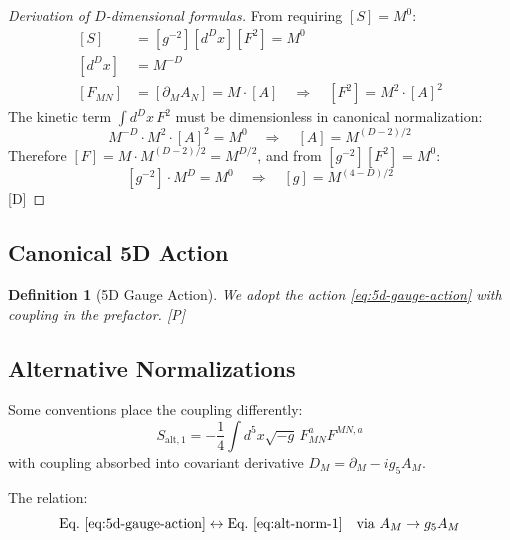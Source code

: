 \documentclass[11pt,a4paper]{article}
\newtheorem{definition}[theorem]{Definition}
\newcommand{\tagD}{\textcolor{blue!70!black}{[D]}}
\newcommand{\tagP}{\textcolor{green!50!black}{[P]}}
\begin{document}
\begin{proof}[Derivation of $D$-dimensional formulas]
From requiring $[S] = M^0$:
\begin{align}
\label{eq:dim-deriv-1}
[S] &= [g^{-2}][d^D x][F^2] = M^0 \\
\label{eq:dim-deriv-2}
[d^D x] &= M^{-D} \\
\label{eq:dim-deriv-3}
[F_{MN}] &= [\partial_M A_N] = M \cdot [A] \quad \Rightarrow \quad [F^2] = M^2 \cdot [A]^2
\end{align}
The kinetic term $\int d^D x\, F^2$ must be dimensionless in canonical normalization:
\begin{equation}
\label{eq:dim-deriv-4}
M^{-D} \cdot M^2 \cdot [A]^2 = M^0 \quad \Rightarrow \quad [A] = M^{(D-2)/2}
\end{equation}
Therefore $[F] = M \cdot M^{(D-2)/2} = M^{D/2}$, and from $[g^{-2}][F^2] = M^0$:
\begin{equation}
\label{eq:dim-deriv-5}
[g^{-2}] \cdot M^D = M^0 \quad \Rightarrow \quad [g] = M^{(4-D)/2}
\end{equation}
\tagD
\end{proof}

\subsection{Canonical 5D Action}

\begin{definition}[5D Gauge Action]
\label{def:5d-action}
We adopt the action \eqref{eq:5d-gauge-action} with coupling in the prefactor. \tagP
\end{definition}

\subsection{Alternative Normalizations}

Some conventions place the coupling differently:
\begin{equation}
\label{eq:alt-norm-1}
S_{\text{alt},1} = -\frac{1}{4} \int d^5x \sqrt{-g}\, F_{MN}^a F^{MN,a}
\end{equation}
with coupling absorbed into covariant derivative $D_M = \partial_M - i g_5 A_M$.

The relation:
\begin{equation}
\label{eq:norm-relation}
\text{Eq.~\eqref{eq:5d-gauge-action}} \leftrightarrow \text{Eq.~\eqref{eq:alt-norm-1}} \quad
\text{via } A_M \to g_5 A_M
\end{equation}
\end{document}
